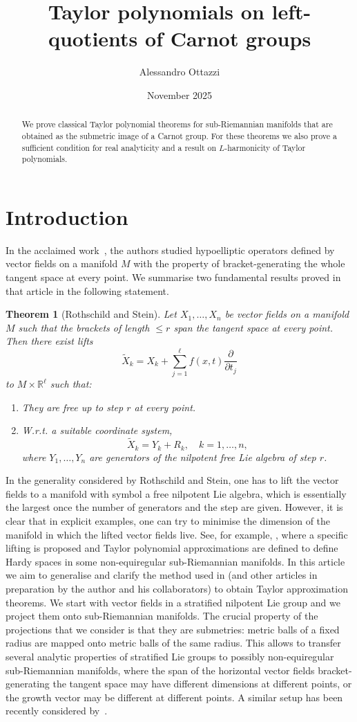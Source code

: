 \documentclass[12pt]{amsart}
\title{Taylor polynomials on left-quotients of Carnot groups}
\author{Alessandro Ottazzi }
\date{November 2025}
\newtheorem{theorem}{Theorem}[section]
\begin{document}
\maketitle
\begin{abstract}
    We prove classical Taylor polynomial theorems for sub-Riemannian manifolds that are obtained as the submetric image of a Carnot group. For these theorems we also prove a sufficient condition for real analyticity and a result on $L$-harmonicity of  Taylor polynomials. 
\end{abstract}
\section{Introduction}
In the acclaimed work~\cite{RotStein}, the authors studied hypoelliptic operators defined by vector fields on a manifold $M$ with the property of bracket-generating the whole tangent space at every point. 
We summarise two fundamental results proved in that article in the following statement.
\begin{theorem}[Rothschild and Stein]
Let $X_1,\dots,X_n$ be vector fields on a manifold $M$ such that the brackets of length $\leq r$ span the tangent space at every point. Then there exist lifts
$$
\tilde X_k = X_k +\sum_{j=1}^\ell
f(x,t)\frac{\partial}{\partial t_j}$$
to $M\times \mathbb R^\ell$ such that:
\begin{enumerate}
    \item 
They
are free up to step $r$ at every point.
\item W.r.t. a suitable coordinate system, 
$$
\tilde X_k = Y_k +R_k, \quad k=1,\dots,n,
$$
where $Y_1,\dots,Y_n$ are generators of the nilpotent free Lie algebra of step $r$.
\end{enumerate}
\end{theorem}
In the generality considered by Rothschild and Stein, one has to lift the vector fields to a manifold with symbol a free nilpotent Lie algebra, which is essentially the largest once the number of generators and the step are given. However, it is clear that in explicit examples, one can try to minimise the dimension of the manifold in which the lifted vector fields live. See, for example, \cite{CLOW}, where a specific lifting is proposed and Taylor polynomial approximations are defined to define Hardy spaces in some non-equiregular sub-Riemannian manifolds.
In this article we aim to generalise and clarify the method used in \cite{CLOW} (and other articles in preparation by the author and his collaborators) to obtain Taylor approximation theorems. We start with vector fields in a stratified nilpotent Lie group and we project them onto sub-Riemannian manifolds. The crucial property of the projections that we consider is that they are submetries: metric balls of a fixed radius are mapped onto metric balls of the same radius. This allows to transfer several analytic properties of stratified Lie groups to possibly non-equiregular sub-Riemannian manifolds, where the span of the horizontal vector fields bracket-generating the tangent space may have different dimensions at different points, or the growth vector may be different at different points. 
A similar setup has been recently considered by~\cite{Bon2}.
\end{document}
